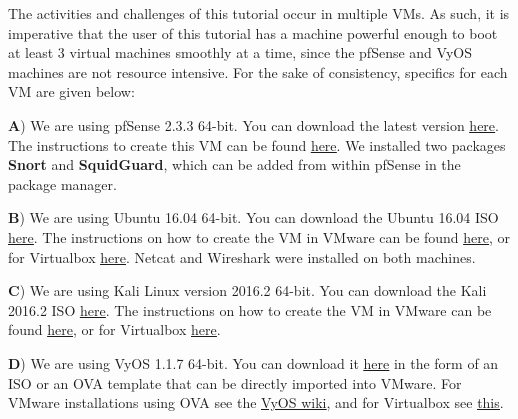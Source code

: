 \documentclass[12pt]{extarticle}
\begin{document}
\vspace{8mm}
\noindent
The activities and challenges of this tutorial occur in multiple VMs. As such, it is imperative that the user of this tutorial has a machine powerful enough to boot at least 3 virtual machines smoothly at a time, since the pfSense and VyOS machines are not resource intensive. For the sake of consistency, specifics for each VM are given below:

\vspace{4mm}
\noindent
\label{pfSenseSetup}
\textbf{A}) We are using pfSense 2.3.3 64-bit. You can download the latest version \href{https://www.pfsense.org/download/}{\underline{here}}. The instructions to create this VM can be found \href{https://obviate.io/2015/08/31/tutorial-using-vmware-esxi-and-pfsense-as-a-network-firewallrouter/}{\underline{here}}. We installed two packages \textbf{Snort} and \textbf{SquidGuard}, which can be added from within pfSense in the package manager.

\vspace{4mm}
\noindent
\label{UbuntuSetup}
\textbf{B}) We are using Ubuntu 16.04 64-bit. You can download the Ubuntu 16.04 ISO \href{https://www.ubuntu.com/download/desktop}{\underline{here}}. The instructions on how to create the VM in VMware can be found \href{https://kb.vmware.com/selfservice/microsites/search.do?language=en_US&cmd=displayKC&externalId=1002}{\underline{here}}, or for Virtualbox \href{http://www.hacking-tutorial.com/hacking-tutorial/10-steps-how-to-create-kali-linux-virtual-machine-in-virtual-box/}{\underline{here}}. Netcat and Wireshark were installed on both machines.

\vspace{4mm}
\noindent
\label{KaliSetup}
\textbf{C}) We are using Kali Linux version 2016.2 64-bit. You can download the Kali 2016.2 ISO \href{https://www.kali.org/downloads/}{\underline{here}}. The instructions on how to create the VM in VMware can be found \href{http://www.sysadminshowto.com/how-to-install-kali-linux-2-sana-in-vmware-workstation-11-step-by-step-guide/}{\underline{here}}, or for Virtualbox \href{https://docs.oracle.com/cd/E26217_01/E26796/html/qs-create-vm.html}{\underline{here}}.

\vspace{4mm}
\noindent
\label{VyOSSetup}
\textbf{D}) We are using VyOS 1.1.7 64-bit. You can download it \href{http://packages.vyos.net/iso/release/1.1.7/}{\underline{here}} in the form of an ISO or an OVA template that can be directly imported into VMware. For VMware installations using OVA see the \href{https://wiki.vyos.net/wiki/VMWare}{\underline{VyOS wiki}}, and for Virtualbox see \href{https://nbctcp.wordpress.com/2015/01/20/vyatta-os-under-virtualbox-in-gns3/}{\underline{this}}.\\
\end{document}
